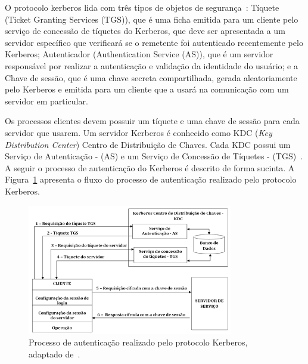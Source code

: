 O protocolo kerberos lida com três tipos de objetos de segurança~\cite{coulouris2013}: Tíquete (Ticket Granting Services (TGS)), que é uma ficha emitida para um cliente pelo serviço de concessão de tíquetes do Kerberos, que deve ser apresentada a um servidor específico que verificará se o remetente foi autenticado recentemente pelo Kerberos; Autenticador (Authentication Service (AS)), que é um servidor responsável por realizar a autenticação e validação da identidade do usuário; e a Chave de sessão, que é uma chave secreta compartilhada, gerada aleatoriamente pelo Kerberos e emitida para um cliente que a usará na comunicação com um servidor em particular.

Os processos clientes devem possuir um tíquete e uma chave de sessão para cada servidor que usarem. Um servidor Kerberos é conhecido como KDC (\emph{Key Distribution Center}) Centro de Distribuição de Chaves. Cada KDC possui um Serviço de Autenticação - (AS) e um Serviço de Concessão de Tíquetes - (TGS)~\cite{coulouris2013}. A seguir o processo de autenticação do Kerberos é descrito de forma sucinta. A Figura~\ref{fig:kerberos} apresenta o fluxo do processo de autenticação realizado pelo protocolo Kerberos.

\begin{figure}[!htb]
\centering
\includegraphics[width=0.8\textwidth]{arquitetura_protocolo_keberos.png}
\caption{Processo de autenticação realizado pelo protocolo Kerberos, adaptado de~\cite{coulouris2013}.}
\label{fig:kerberos}
\end{figure}

